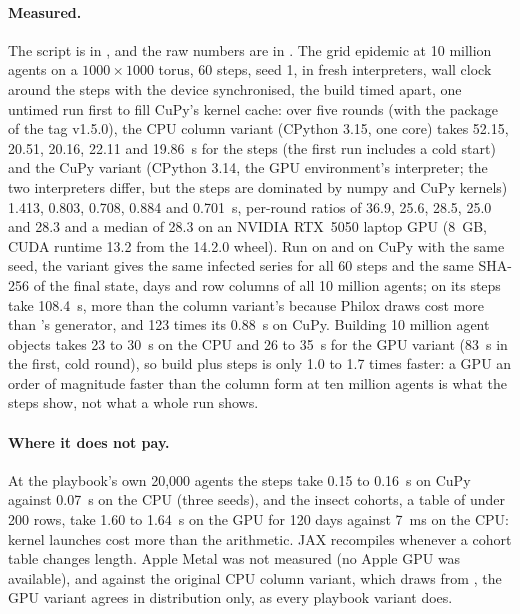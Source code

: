 \paragraph{Measured.} The script is  in ,
and the raw numbers are in . The grid epidemic at 10
million agents on a $1000 \times 1000$ torus, 60 steps, seed 1, in fresh interpreters, wall
clock around the steps with the device synchronised, the build timed apart, one untimed run
first to fill CuPy's kernel cache: over five rounds (with the  package of the tag v1.5.0), the CPU
column variant (CPython 3.15, one core) takes 52.15, 20.51, 20.16, 22.11 and 19.86~s for the
steps (the first run includes a cold start) and the CuPy variant (CPython 3.14, the GPU environment's interpreter;
the two interpreters differ, but the steps are dominated by numpy and CuPy kernels) 1.413, 0.803, 0.708, 0.884 and
0.701~s, per-round ratios of 36.9, 25.6, 28.5, 25.0 and 28.3 and a median of 28.3 on an NVIDIA RTX~5050 laptop GPU
(8~GB, CUDA runtime 13.2 from the  14.2.0 wheel). Run on  and on CuPy with the same seed, the variant
gives the same infected series for all 60 steps and the same SHA-256 of the final state, days
and row columns of all 10 million agents; on  its steps take 108.4~s, more than the
column variant's because Philox draws cost more than 's generator, and 123 times its
0.88~s on CuPy. Building 10 million agent objects takes 23 to 30~s on the CPU and 26 to 35~s
for the GPU variant (83~s in the first, cold round), so build plus steps is only 1.0 to 1.7
times faster: a GPU an order of magnitude faster than the
column form at ten million agents is what the steps show, not what a whole run shows.

\paragraph{Where it does not pay.} At the playbook's own 20,000 agents the steps take 0.15
to 0.16~s on CuPy against 0.07~s on the CPU (three seeds), and the insect cohorts, a
table of under 200 rows, take 1.60 to 1.64~s on the GPU for 120 days against 7~ms on the
CPU: kernel launches cost more than the arithmetic. JAX recompiles whenever a cohort table changes
length. Apple Metal was not measured (no Apple GPU was available), and against the original
CPU column variant, which draws from , the GPU variant agrees in distribution
only, as every playbook variant does.


